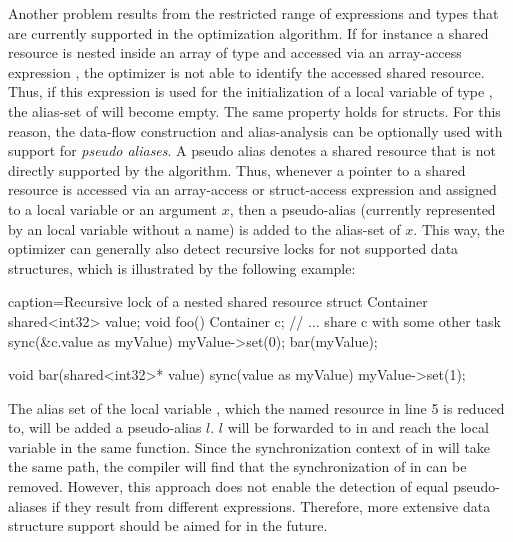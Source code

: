 Another problem results from the restricted range of expressions and types that are currently supported in the optimization algorithm. If for instance a shared resource is nested inside an array  of type  and accessed via an array-access expression , the optimizer is not able to identify the accessed shared resource. Thus, if this expression is used for the initialization of a local variable  of type , the alias-set of  will become empty. The same property holds for structs. For this reason, the data-flow construction and alias-analysis can be optionally used with support for \textit{pseudo aliases}. A pseudo alias denotes a shared resource that is not directly supported by the algorithm. Thus, whenever a pointer to a shared resource is accessed via an array-access or struct-access expression and assigned to a local variable or an argument $x$, then a pseudo-alias (currently represented by an local variable without a name) is added to the alias-set of $x$. This way, the optimizer can generally also detect recursive locks for not supported data structures, which is illustrated by the following example:
\begin{ccode}{caption=Recursive lock of a nested shared resource}
struct Container { shared<int32> value; }
void foo() {
  Container c;
  // ... share c with some other task
  sync(&c.value as myValue) {
    myValue->set(0);
    bar(myValue);
  }
}

void bar(shared<int32>* value) {
  sync(value as myValue) { myValue->set(1); }
}
\end{ccode}
The alias set of the local variable , which the named resource in line 5 is reduced to, will be added a pseudo-alias $l$. $l$ will be forwarded to  in  and reach the local variable  in the same function. Since the synchronization context of  in  will take the same path, the compiler will find that the synchronization of  in  can be removed. However, this approach does not enable the detection of equal pseudo-aliases if they result from different expressions. Therefore, more extensive data structure support should be aimed for in the future.


